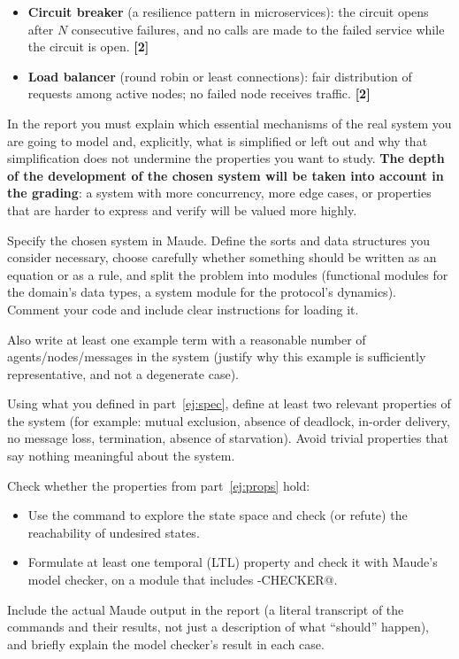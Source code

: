\begin{listaejercicios}
\begin{itemize}
\item
\textbf{Circuit breaker} (a resilience pattern in microservices): the
circuit opens after $N$ consecutive failures, and no calls are made to the
failed service while the circuit is open. \textbf{[2]}

\item
\textbf{Load balancer} (round robin or least connections): fair
distribution of requests among active nodes; no failed node receives
traffic. \textbf{[2]}
\end{itemize}

In the report you must explain which essential mechanisms of the real
system you are going to model and, explicitly, what is simplified or left
out and why that simplification does not undermine the properties you want
to study. \textbf{The depth of the development of the chosen system will be
taken into account in the grading}: a system with more concurrency, more
edge cases, or properties that are harder to express and verify will be
valued more highly.

\item\label{ej:spec}
Specify the chosen system in Maude. Define the sorts and data structures
you consider necessary, choose carefully whether something should be
written as an equation or as a rule, and split the problem into modules
(functional modules for the domain's data types, a system module for the
protocol's dynamics). Comment your code and include clear instructions for
loading it.

Also write at least one example term with a reasonable number of
agents/nodes/messages in the system (justify why this example is
sufficiently representative, and not a degenerate case).

\item\label{ej:props}
Using what you defined in part~\ref{ej:spec}, define at least two relevant
properties of the system (for example: mutual exclusion, absence of
deadlock, in-order delivery, no message loss, termination, absence of
starvation). Avoid trivial properties that say nothing meaningful about the
system.

\item\label{ej:verificacion}
Check whether the properties from part~\ref{ej:props} hold:
\begin{itemize}
\item
Use the \verb@search@ command to explore the state space and check (or
refute) the reachability of undesired states.

\item
Formulate at least one temporal (LTL) property and check it with Maude's
model checker, on a module that includes \verb@MODEL-CHECKER@.
\end{itemize}
Include the actual Maude output in the report (a literal transcript of the
commands and their results, not just a description of what ``should''
happen), and briefly explain the model checker's result in each case.


\end{listaejercicios}
